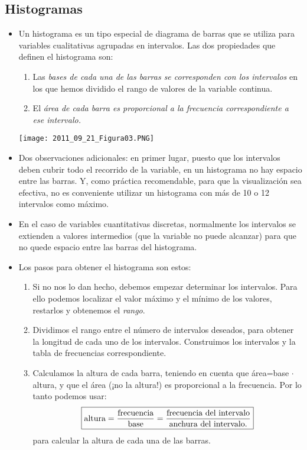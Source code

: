 \subsection{Histogramas}

\begin{itemize}

    \item Un {\sf histograma} es un tipo especial de diagrama de barras que se utiliza para variables cualitativas agrupadas en intervalos. Las dos propiedades que definen el histograma son:
        \begin{enumerate}
            \item Las {\em bases de cada una de las barras se corresponden con los intervalos} en los que hemos dividido el rango de valores de la variable continua.
            \item El {\em área de cada barra es proporcional a la frecuencia correspondiente a ese intervalo.}
        \end{enumerate}
         \begin{center}
         \texttt{[image: 2011\_09\_21\_Figura03.PNG]}
         \end{center}

    \item Dos observaciones adicionales: en primer lugar, puesto que los intervalos deben cubrir todo el recorrido de la variable, en un histograma no hay espacio entre las barras. Y, como práctica recomendable, para que la visualización sea efectiva, no es conveniente utilizar un histograma con más de 10 o 12 intervalos como máximo.

    \item En el caso de {\sf variables cuantitativas discretas}, normalmente los intervalos se extienden a valores intermedios (que la variable no puede alcanzar) para que no quede espacio entre las barras del histograma.

    \item Los pasos para obtener el histograma son estos:
        \begin{enumerate}
            \item Si no nos lo dan hecho, debemos empezar determinar los intervalos. Para ello podemos localizar el valor máximo y el mínimo de los valores, restarlos y obtenemos el {\em rango}.
            \item Dividimos el rango entre el número de intervalos deseados, para obtener la longitud de cada uno de los intervalos. Construimos los intervalos y la tabla de frecuencias correspondiente.
            \item Calculamos la altura de cada barra, teniendo en cuenta que área=base $\cdot$ altura, y que el área (¡no la altura!) es proporcional a la frecuencia. Por lo tanto podemos usar:
                \[\fbox{$\mbox{altura}=\dfrac{\mbox{frecuencia}}{\mbox{base}}=\dfrac{\mbox{frecuencia del intervalo}}{\mbox{anchura del intervalo}.}$}\]
                para calcular la altura de cada una de las barras.
        \end{enumerate}


\end{itemize}
